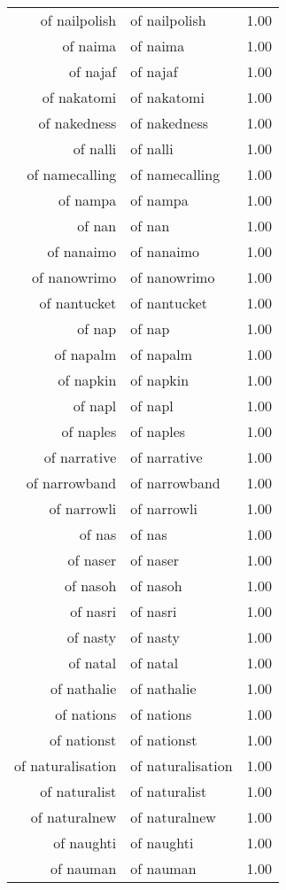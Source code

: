 \begin{table}[ht]
\begin{tabular}{rlr}
  of nailpolish & of nailpolish & 1.00 \\ 
  of naima & of naima & 1.00 \\ 
  of najaf & of najaf & 1.00 \\ 
  of nakatomi & of nakatomi & 1.00 \\ 
  of nakedness & of nakedness & 1.00 \\ 
  of nalli & of nalli & 1.00 \\ 
  of namecalling & of namecalling & 1.00 \\ 
  of nampa & of nampa & 1.00 \\ 
  of nan & of nan & 1.00 \\ 
  of nanaimo & of nanaimo & 1.00 \\ 
  of nanowrimo & of nanowrimo & 1.00 \\ 
  of nantucket & of nantucket & 1.00 \\ 
  of nap & of nap & 1.00 \\ 
  of napalm & of napalm & 1.00 \\ 
  of napkin & of napkin & 1.00 \\ 
  of napl & of napl & 1.00 \\ 
  of naples & of naples & 1.00 \\ 
  of narrative & of narrative & 1.00 \\ 
  of narrowband & of narrowband & 1.00 \\ 
  of narrowli & of narrowli & 1.00 \\ 
  of nas & of nas & 1.00 \\ 
  of naser & of naser & 1.00 \\ 
  of nasoh & of nasoh & 1.00 \\ 
  of nasri & of nasri & 1.00 \\ 
  of nasty & of nasty & 1.00 \\ 
  of natal & of natal & 1.00 \\ 
  of nathalie & of nathalie & 1.00 \\ 
  of nations & of nations & 1.00 \\ 
  of nationst & of nationst & 1.00 \\ 
  of naturalisation & of naturalisation & 1.00 \\ 
  of naturalist & of naturalist & 1.00 \\ 
  of naturalnew & of naturalnew & 1.00 \\ 
  of naughti & of naughti & 1.00 \\ 
  of nauman & of nauman & 1.00 \\ 

\end{tabular}
\end{table}
